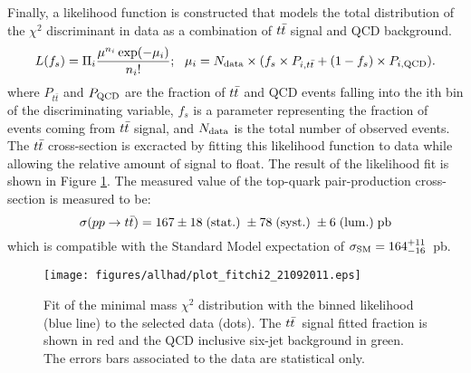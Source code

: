 Finally, a likelihood function is constructed that models the total distribution of the $\chi^2$ discriminant in data
as a combination of $\ttbar$ signal and QCD background.
\begin{equation}
L(f_s) = \Pi_{i} \frac{ \mu^{n_{i}} \exp(-\mu_i) }{n_{i}!}; \ \  \mu_{i} = N_{{\rm data}} \times ( f_s \times P_{i,t\bar{t}}  + (1 - f_{s}) \times P_{i,{\rm QCD}}).
\end{equation}
where $P_{t\bar{t}}$ and $P_{{\rm QCD}}$ are the fraction of $\ttbar$ and QCD events falling into the ith bin of the discriminating variable, 
$f_s$ is a parameter representing the fraction of events coming from $\ttbar$ signal, 
and $N_{{\rm data}}$ is the total number of observed events.
The $\ttbar$ cross-section is excracted by fitting this likelihood function to data while allowing the relative amount of signal to float.
The result of the likelihood fit is shown in Figure \ref{fig:fitchi2_3_Jet.eps}. 
The measured value of the top-quark pair-production cross-section is measured to be:
\begin{equation*}
 \sigma {(pp \to t\bar{t})} = 167 \pm 18 \; {\rm (stat.)} \; \pm 78 \; {\rm (syst.)} \;  \pm 6 \;  {\rm (lum.)} \; {\rm pb}
\end{equation*}
which is compatible with the Standard Model expectation of  $\sigma_{{\rm SM}} = 164^{+11} _{-16}$~pb.



\begin{figure}[h!]
  \begin{center}
    \texttt{[image: figures/allhad/plot\_fitchi2\_21092011.eps]}
  \end{center}
  \caption{Fit of the minimal mass $\chi^2$ distribution with the binned likelihood (blue line) to the selected data (dots). The $\ttbar$~signal fitted fraction is shown in red and the QCD inclusive six-jet background  in green. The errors bars associated to the data are statistical only.}
  \label{fig:fitchi2_3_Jet.eps}
\end{figure}



